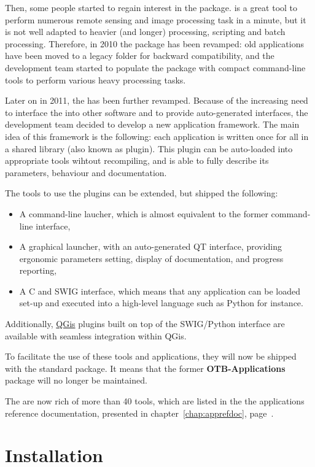 Then, some people started to regain interest in the \app
package. \mont is a great tool to perform numerous remote sensing and
image processing task in a minute, but it is not well adapted to
heavier (and longer) processing, scripting and batch
processing. Therefore, in 2010 the \app package has been revamped: old
applications have been moved to a legacy folder for backward
compatibility, and the development team started to populate the
package with compact command-line tools to perform various heavy
processing tasks. 

Later on in 2011, the \app has been further revamped. Because of the
increasing need to interface the \app into other software and to
provide auto-generated interfaces, the \otb development team decided
to develop a new application framework. The main idea of this
framework is the following: each application is written once for all
in a shared library (also known as plugin). This plugin can be
auto-loaded into appropriate tools wihtout recompiling, and is able to
fully describe its parameters, behaviour and documentation.

The tools to use the plugins can be extended, but \otb shipped the
following:
\begin{itemize}
\item A command-line laucher, which is almost equivalent to the former
  \app command-line interface,
\item A graphical launcher, with an auto-generated QT interface,
  providing ergonomic parameters setting, display of documentation,
  and progress reporting,
\item A C and SWIG interface, which means that any application can be
  loaded set-up and executed into a high-level language such as Python
  for instance.
\end{itemize}

Additionally, \href{http://www.qgis.org/}{QGis} plugins built on top of the SWIG/Python interface
are available with seamless integration within QGis.

To facilitate the use of these tools and applications, they will now
be shipped with the standard \otb package. It means that the former
\textbf{OTB-Applications} package will no longer be maintained.

The \app are now rich of more than 40 tools, which are listed in the
the applications reference documentation, presented in
chapter~\ref{chap:apprefdoc}, page~\pageref{chap:apprefdoc}.

\section{Installation}\label{sec:appinstall}

